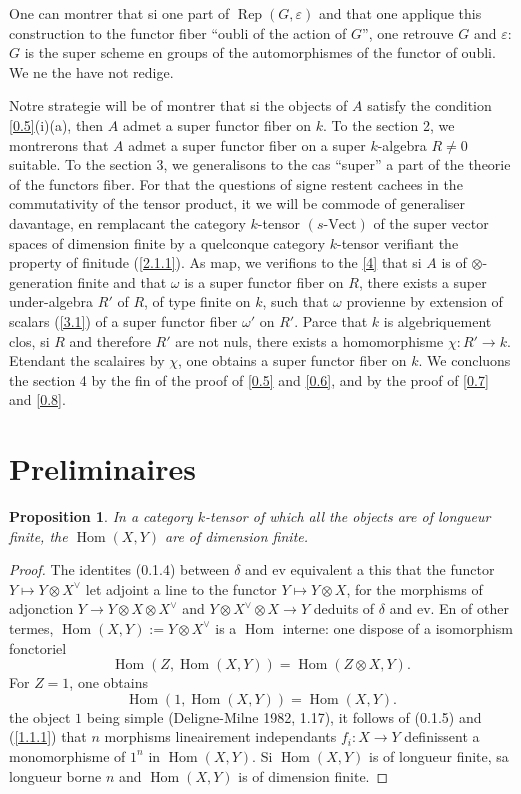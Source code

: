 \documentclass[11pt,a4paper]{article}
\theoremstyle{plain}
\newtheorem{proposition}[theorem]{Proposition}
\theoremstyle{definition}
\DeclareMathOperator{\Hom}{Hom}
\newcommand{\ev}{\mathrm{ev}}
\newcommand{\Vect}{\mathrm{Vect}}
\newcommand{\Rep}{\operatorname{Rep}}
\begin{document}
One can montrer that si one part of $\Rep(G,\varepsilon)$ and that one applique this construction to the functor fiber ``oubli of the action of $G$'', one retrouve $G$ and $\varepsilon$: $G$ is the super scheme en groups of the automorphismes of the functor of oubli. We ne the have not redige.

Notre strategie will be of montrer that si the objects of $A$ satisfy the condition \ref{0.5}(i)(a), then $A$ admet a super functor fiber on $k$. To the section 2, we montrerons that $A$ admet a super functor fiber on a super $k$-algebra $R\neq0$ suitable. To the section 3, we generalisons to the cas ``super'' a part of the theorie of the functors fiber. For that the questions of signe restent cachees in the commutativity of the tensor product, it we will be commode of generaliser davantage, en remplacant the category $k$-tensor $(s\text{-}\Vect)$ of the super vector spaces of dimension finite by a quelconque category $k$-tensor verifiant the property of finitude (\ref{2.1.1}). As map, we verifions to the \ref{4} that si $A$ is of $\otimes$-generation finite and that $\omega$ is a super functor fiber on $R$, there exists a super under-algebra $R'$ of $R$, of type finite on $k$, such that $\omega$ provienne by extension of scalars (\ref{3.1}) of a super functor fiber $\omega'$ on $R'$. Parce that $k$ is algebriquement clos, si $R$ and therefore $R'$ are not nuls, there exists a homomorphisme $\chi:R'\to k$. Etendant the scalaires by $\chi$, one obtains a super functor fiber on $k$. We concluons the section 4 by the fin of the proof of \ref{0.5} and \ref{0.6}, and by the proof of \ref{0.7} and \ref{0.8}.

\section{Preliminaires}\label{1}

\begin{proposition}\label{1.1}
In a category $k$-tensor of which all the objects are of longueur finite, the $\Hom(X,Y)$ are of dimension finite.
\end{proposition}

\begin{proof}
The identites (0.1.4) between $\delta$ and $\ev$ equivalent a this that the functor $Y\mapsto Y\otimes X^\vee$ let adjoint a line to the functor $Y\mapsto Y\otimes X$, for the morphisms of adjonction $Y\to Y\otimes X\otimes X^\vee$ and $Y\otimes X^\vee\otimes X\to Y$ deduits of $\delta$ and $\ev$. En of other termes, $\Hom(X,Y):=Y\otimes X^\vee$ is a $\Hom$ interne: one dispose of a isomorphism fonctoriel
\[
\Hom(Z,\Hom(X,Y))=\Hom(Z\otimes X,Y).
\]
For $Z=1$, one obtains
\begin{equation}\label{1.1.1}
\Hom(1,\Hom(X,Y))=\Hom(X,Y).
\end{equation}
the object $1$ being simple (Deligne-Milne 1982, 1.17), it follows of (0.1.5) and (\ref{1.1.1}) that $n$ morphisms lineairement independants $f_i:X\to Y$ definissent a monomorphisme of $1^n$ in $\Hom(X,Y)$. Si $\Hom(X,Y)$ is of longueur finite, sa longueur borne $n$ and $\Hom(X,Y)$ is of dimension finite.
\end{proof}
\end{document}
